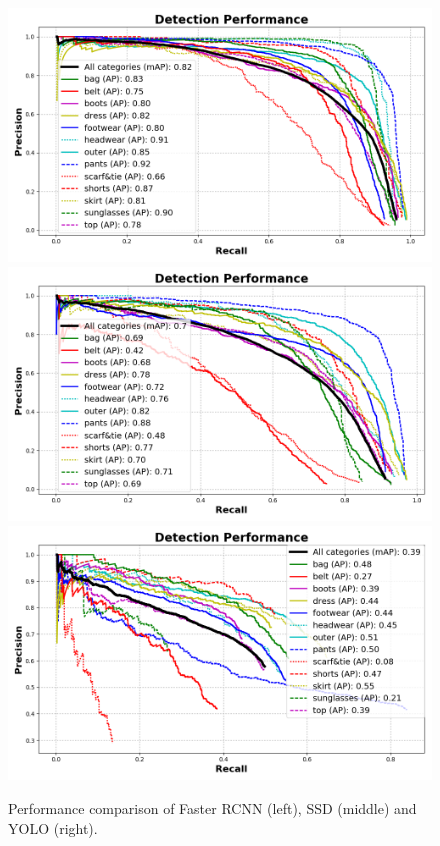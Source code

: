 \begin{figure}[H]
	\begin{center}
		\includegraphics[width=.32\linewidth]{./figures/faster_pr_0_5.png}
		\includegraphics[width=.32\linewidth]{./figures/ssd_pr_0_5.png}
		\includegraphics[width=.32\linewidth]{./figures/yolo_pr_0_5.png}
	\end{center}
	\vspace{-2mm}
	\caption{Performance comparison of Faster RCNN (left), SSD (middle) and YOLO (right).}
	\label{fig:map-per-cat}
\end{figure}

